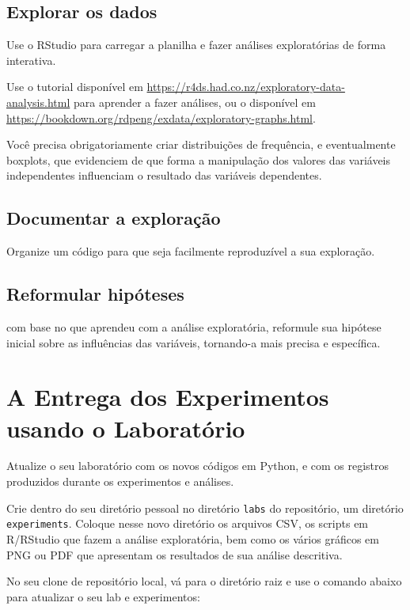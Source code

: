 \subsection{Explorar os dados}

Use o RStudio para carregar a planilha e fazer análises exploratórias de forma interativa.

Use o tutorial disponível em \url{https://r4ds.had.co.nz/exploratory-data-analysis.html}
para aprender a fazer análises, ou o disponível em
\url{https://bookdown.org/rdpeng/exdata/exploratory-graphs.html}.

Você precisa obrigatoriamente criar distribuições de frequência, e eventualmente boxplots, que evidenciem de que forma a manipulação dos valores das variáveis independentes influenciam o resultado das variáveis dependentes.

\subsection{Documentar a exploração} 

Organize um código para que seja facilmente reproduzível a sua exploração.

\subsection{Reformular hipóteses}

com base no que aprendeu com a análise exploratória, reformule sua hipótese inicial sobre as influências das variáveis, tornando-a mais precisa e específica. 

\section{A Entrega dos Experimentos usando o Laboratório}

Atualize o seu laboratório com os novos códigos em Python, e com os registros produzidos durante os experimentos e análises.

    Crie dentro do seu diretório pessoal no diretório \verb|labs| do repositório, um diretório \verb|experiments|. Coloque nesse novo diretório os arquivos CSV, os scripts em R/RStudio que fazem a análise exploratória, bem como os vários gráficos em PNG ou PDF que apresentam os resultados de sua análise descritiva.

No seu clone de repositório local, vá para o diretório raiz e use o comando abaixo para atualizar o seu lab e experimentos:

